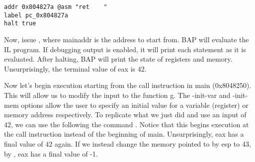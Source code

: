 \begin{verbatim}
addr 0x804827a @asm "ret    "
label pc_0x804827a
halt true
\end{verbatim}

Now, issue , where mainaddr
is the address to start from.  BAP will evaluate the IL program.  If
debugging output is enabled, it will print each statement as it is
evaluated.  After halting, BAP will print the state of registers and
memory. Unsurprisingly, the terminal value of eax is 42.  

Now let's begin execution starting from the call instruction in main
(0x8048250). This will allow us to modify the input to the function
g. The -init-var and -init-mem options allow the user to specify an
initial value for a variable (register) or memory address
respectively.  To replicate what we just did and use an input of 42,
we can use the following the command . Notice that this
begins execution at the call instruction instead of the beginning of
main.  Unsurprisingly, eax has a final value of 42 again.  If we
instead change the memory pointed to by esp to 43, by , eax has
a final value of -1.
